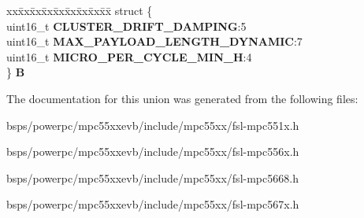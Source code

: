 \begin{DoxyCompactItemize}
\begin{tabbing}
\end{tabbing}\item 
\mbox{\label{unionuPCR24_a60f9fba38023c561bf3952ed7287661c}} 
\begin{tabbing}
xx\=xx\=xx\=xx\=xx\=xx\=xx\=xx\=xx\=\kill
struct \{\\
\>uint16\_t {\bfseries CLUSTER\_DRIFT\_DAMPING}:5\\
\>uint16\_t {\bfseries MAX\_PAYLOAD\_LENGTH\_DYNAMIC}:7\\
\>uint16\_t {\bfseries MICRO\_PER\_CYCLE\_MIN\_H}:4\\
\} {\bfseries B}\\

\end{tabbing}\end{DoxyCompactItemize}


The documentation for this union was generated from the following files\+:\begin{DoxyCompactItemize}
\item 
bsps/powerpc/mpc55xxevb/include/mpc55xx/fsl-\/mpc551x.\+h\item 
bsps/powerpc/mpc55xxevb/include/mpc55xx/fsl-\/mpc556x.\+h\item 
bsps/powerpc/mpc55xxevb/include/mpc55xx/fsl-\/mpc5668.\+h\item 
bsps/powerpc/mpc55xxevb/include/mpc55xx/fsl-\/mpc567x.\+h\end{DoxyCompactItemize}

